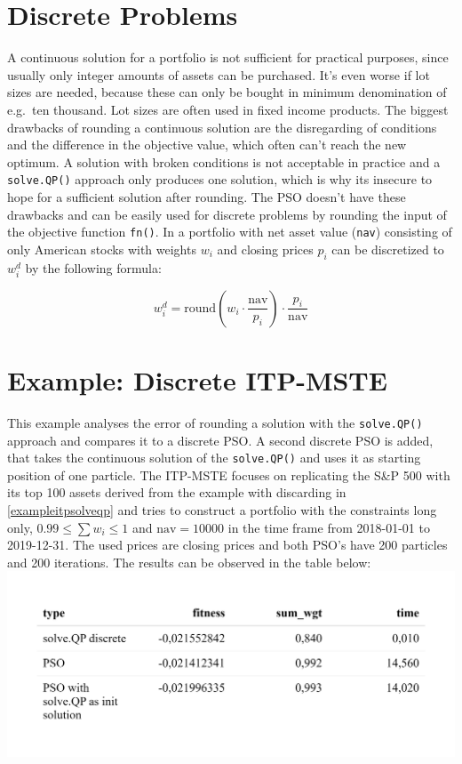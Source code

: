 \documentclass[
  oneside]{book}
\begin{document}
\hypertarget{discrete-problems}{%
\section{Discrete Problems}\label{discrete-problems}}

A continuous solution for a portfolio is not sufficient for practical purposes, since usually only integer amounts of assets can be purchased. It's even worse if lot sizes are needed, because these can only be bought in minimum denomination of e.g.~ten thousand. Lot sizes are often used in fixed income products. The biggest drawbacks of rounding a continuous solution are the disregarding of conditions and the difference in the objective value, which often can't reach the new optimum. A solution with broken conditions is not acceptable in practice and a \texttt{solve.QP()} approach only produces one solution, which is why its insecure to hope for a sufficient solution after rounding. The PSO doesn't have these drawbacks and can be easily used for discrete problems by rounding the input of the objective function \texttt{fn()}. In a portfolio with net asset value (\texttt{nav}) consisting of only American stocks with weights \(w_i\) and closing prices \(p_i\) can be discretized to \(w_i^d\) by the following formula:

\[
  w_i^d =\text{round}(w_i \cdot \frac{\text{nav}}{p_i})\cdot \frac{p_i}{\text{nav}}
\]

\hypertarget{example-discrete-itp-mste}{%
\section{Example: Discrete ITP-MSTE}\label{example-discrete-itp-mste}}

This example analyses the error of rounding a solution with the \texttt{solve.QP()} approach and compares it to a discrete PSO. A second discrete PSO is added, that takes the continuous solution of the \texttt{solve.QP()} and uses it as starting position of one particle. The ITP-MSTE focuses on replicating the S\&P 500 with its top 100 assets derived from the example with discarding in \ref{exampleitpsolveqp} and tries to construct a portfolio with the constraints long only, \(0.99 \leq \textstyle\sum w_i \leq 1\) and \(\text{nav} = 10000\) in the time frame from 2018-01-01 to 2019-12-31. The used prices are closing prices and both PSO's have 200 particles and 200 iterations. The results can be observed in the table below:
\includegraphics{Master_Thesis_files/figure-latex/pso9-1.png}
\end{document}
